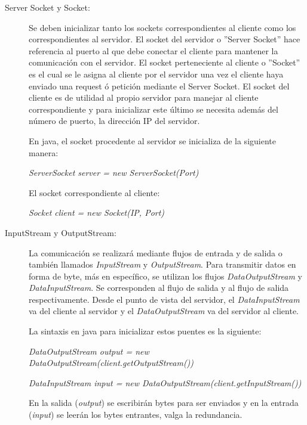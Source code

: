 \documentclass[a4paper,11pt]{book}
\begin{document}
		\begin{description}
				 \item[Server Socket y Socket:] Se deben inicializar tanto los sockets correspondientes al cliente como los correspondientes al servidor. El socket del servidor o ''Server Socket''  hace referencia al puerto al que debe conectar el cliente para mantener la comunicación con el servidor. El socket perteneciente al cliente o ''Socket'' es el cual se le asigna al cliente por el servidor una vez el cliente haya enviado una request ó petición  mediante el Server Socket. El socket del cliente es de utilidad al propio servidor para manejar al cliente correspondiente y para inicializar este último se necesita además del número de puerto, la dirección IP del servidor.
				 
				 En java, el socket procedente al servidor se inicializa de la siguiente manera:
				 \begin{center}
				 \textit{ServerSocket server = new ServerSocket(Port)}
				 \end{center}
				 El socket correspondiente al cliente:
				 \begin{center}
				 \textit{Socket client = new Socket(IP, Port)}
				 \end{center}
				 
				 \item[InputStream y OutputStream:] La comunicación se realizará mediante flujos de entrada y de salida o también llamados \textit{InputStream} y \textit{OutputStream}. Para transmitir datos en forma de byte, más en específico, se utilizan los flujos \textit{DataOutputStream} y \textit{DataInputStream}. Se corresponden al flujo de salida y al flujo de salida respectivamente. Desde el punto de vista del servidor, el \textit{DataInputStream} va del cliente al servidor y el \textit{DataOutputStream} va del servidor al cliente.
				 
				 La sintaxis en java para inicializar estos puentes es la siguiente:
				 \begin{center}
				 \textit{DataOutputStream  output = new DataOutputStream(client.getOutputStream())}
				 
				 \textit{DataInputStream  input = new DataOutputStream(client.getInputStream())}
				 \end{center}
				 En la salida (\textit{output}) se escribirán bytes para ser enviados y en la entrada (\textit{input}) se leerán los bytes entrantes, valga la redundancia.
				 \end{description}	
				 
\end{document}
